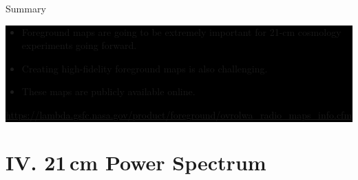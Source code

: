 \documentclass{beamer}
\begin{document}
{
    \begin{frame}[t]{Summary}
        \colorbox{black}{
            \begin{minipage}{\textwidth}
                \begin{itemize}[label=\textbullet]
                    \item Foreground maps are going to be extremely important for 21-cm cosmology
                        experiments going forward.
                    \item Creating high-fidelity foreground maps is also challenging.
                    \item These maps are publicly available online.
                \end{itemize}
                \begin{center}
                    {\small \url{https://lambda.gsfc.nasa.gov/product/foreground/ovrolwa_radio_maps_info.cfm}}
                \end{center}
            \end{minipage}
        }
    \end{frame}
}


\section{IV. 21\,cm Power Spectrum}
\end{document}
